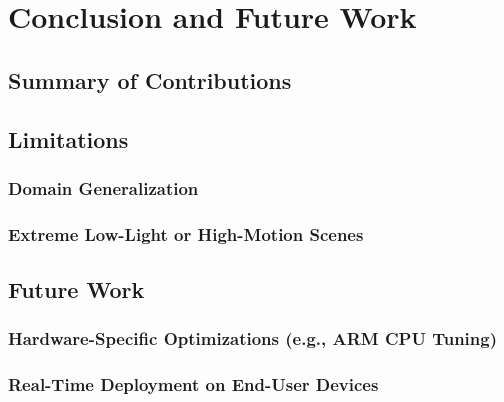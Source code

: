 \chapter{Conclusion and Future Work}
\section{Summary of Contributions}
\section{Limitations}
\subsection{Domain Generalization}
\subsection{Extreme Low-Light or High-Motion Scenes}

\section{Future Work}
\subsection{Hardware-Specific Optimizations (e.g., ARM CPU Tuning)}
\subsection{Real-Time Deployment on End-User Devices}